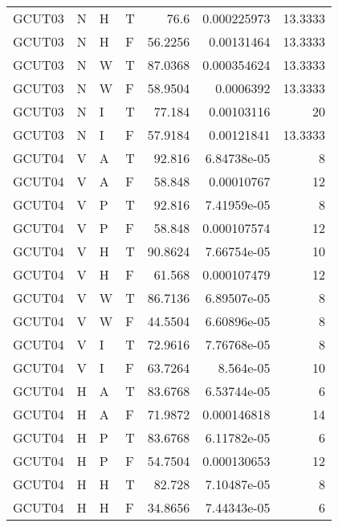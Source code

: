 \begin{longtable}{llllrrr}
    GCUT03   & N     & H     & T          & 76.6       & 0.000225973 & 13.3333  \\
    GCUT03   & N     & H     & F          & 56.2256    & 0.00131464  & 13.3333  \\
    GCUT03   & N     & W     & T          & 87.0368    & 0.000354624 & 13.3333  \\
    GCUT03   & N     & W     & F          & 58.9504    & 0.0006392   & 13.3333  \\
    GCUT03   & N     & I     & T          & 77.184     & 0.00103116  & 20       \\
    GCUT03   & N     & I     & F          & 57.9184    & 0.00121841  & 13.3333  \\
    GCUT04   & V     & A     & T          & 92.816     & 6.84738e-05 & 8        \\
    GCUT04   & V     & A     & F          & 58.848     & 0.00010767  & 12       \\
    GCUT04   & V     & P     & T          & 92.816     & 7.41959e-05 & 8        \\
    GCUT04   & V     & P     & F          & 58.848     & 0.000107574 & 12       \\
    GCUT04   & V     & H     & T          & 90.8624    & 7.66754e-05 & 10       \\
    GCUT04   & V     & H     & F          & 61.568     & 0.000107479 & 12       \\
    GCUT04   & V     & W     & T          & 86.7136    & 6.89507e-05 & 8        \\
    GCUT04   & V     & W     & F          & 44.5504    & 6.60896e-05 & 8        \\
    GCUT04   & V     & I     & T          & 72.9616    & 7.76768e-05 & 8        \\
    GCUT04   & V     & I     & F          & 63.7264    & 8.564e-05   & 10       \\
    GCUT04   & H     & A     & T          & 83.6768    & 6.53744e-05 & 6        \\
    GCUT04   & H     & A     & F          & 71.9872    & 0.000146818 & 14       \\
    GCUT04   & H     & P     & T          & 83.6768    & 6.11782e-05 & 6        \\
    GCUT04   & H     & P     & F          & 54.7504    & 0.000130653 & 12       \\
    GCUT04   & H     & H     & T          & 82.728     & 7.10487e-05 & 8        \\
    GCUT04   & H     & H     & F          & 34.8656    & 7.44343e-05 & 6        \\

\end{longtable}
